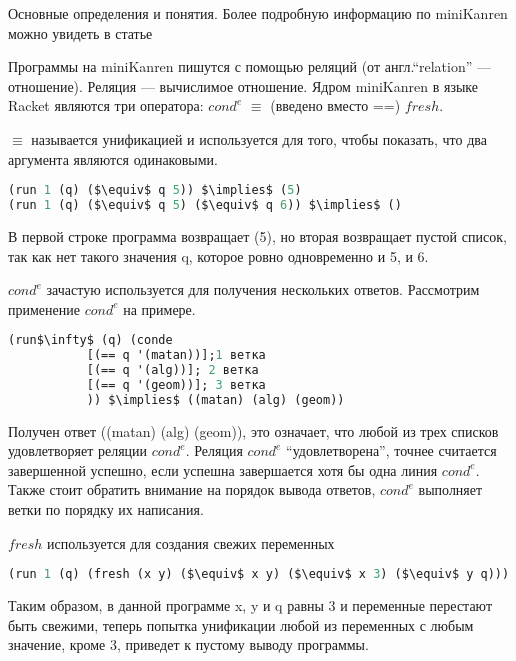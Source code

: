 Основные определения и понятия. Более подробную информацию по miniKanren можно увидеть в статье
~\cite{berd}

Программы на miniKanren пишутся с помощью реляций (от англ.``relation'' --- отношение).
Реляция --- вычислимое отношение. 
Ядром miniKanren в языке Racket являются три оператора: $cond^e$ $\equiv$ (введено вместо ==) $fresh$.

$\equiv$ называется унификацией и используется для того, чтобы показать, что два аргумента являются одинаковыми. 
\begin{lstlisting}[caption=Пример применения унификации, language=OCaml, frame=single]
(run 1 (q) ($\equiv$ q 5)) $\implies$ (5) 
(run 1 (q) ($\equiv$ q 5) ($\equiv$ q 6)) $\implies$ () 
\end{lstlisting}
В первой строке программа возвращает (5), но вторая возвращает пустой список, так как нет такого значения q, которое ровно одновременно и 5, и 6.

$cond^e$ зачастую используется для получения нескольких ответов. Рассмотрим применение $cond^e$ на примере.
\begin{lstlisting}[caption=Пример применения $cond^e$, language=OCaml, frame=single]
(run$\infty$ (q) (conde
           [(== q '(matan))];1 ветка
           [(== q '(alg))]; 2 ветка
           [(== q '(geom))]; 3 ветка
           )) $\implies$ ((matan) (alg) (geom))
\end{lstlisting}
Получен ответ ((matan) (alg) (geom)), это означает, что любой из трех списков удовлетворяет реляции $cond^e$. Реляция $cond^e$ ``удовлетворена'', точнее считается завершенной успешно, если успешна завершается хотя бы одна линия $cond^e$. Также стоит обратить внимание на порядок вывода ответов, $cond^e$ выполняет ветки по порядку их написания.

$fresh$ используется для создания свежих переменных
\begin{lstlisting}[caption=Использование $fresh$ и унификации, language=OCaml, frame=single]
(run 1 (q) (fresh (x y) ($\equiv$ x y) ($\equiv$ x 3) ($\equiv$ y q))) $\implies$ (3)
\end{lstlisting}
Таким образом, в данной программе x, y и q равны 3 и переменные перестают быть свежими, теперь попытка унификации любой из переменных с любым значение, кроме 3, приведет к пустому выводу программы.





